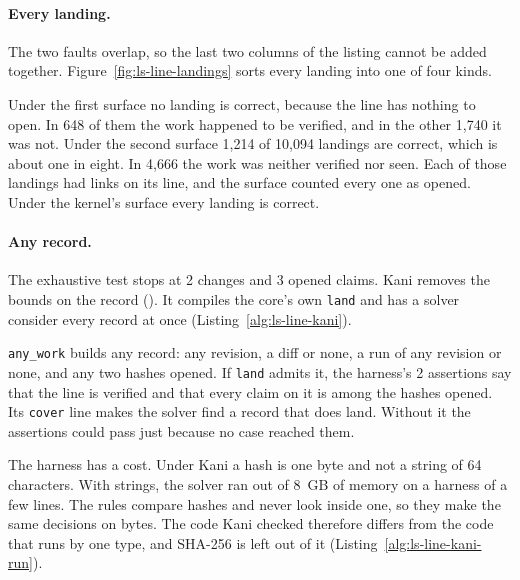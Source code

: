 \paragraph{Every landing.}
The two faults overlap, so the last two columns of the listing cannot be
added together. Figure~\ref{fig:ls-line-landings} sorts every landing into
one of four kinds.



Under the first surface no landing is correct, because the line has
nothing to open. In 648 of them the work happened to be verified, and in
the other 1,740 it was not. Under the second surface 1,214 of 10,094
landings are correct, which is about one in eight. In 4,666 the work was
neither verified nor seen. Each of those landings had links on its line,
and the surface counted every one as opened. Under the kernel's surface
every landing is correct.

\paragraph{Any record.}
The exhaustive test stops at 2 changes and 3 opened claims. Kani removes
the bounds on the record (). It compiles
the core's own \texttt{land} and has a solver consider every record at
once (Listing~\ref{alg:ls-line-kani}).

\texttt{any\_work} builds any record: any revision, a diff or none, a run
of any revision or none, and any two hashes opened. If \texttt{land} admits
it, the harness's 2 assertions say that the line is verified and that every
claim on it is among the hashes opened. Its \texttt{cover} line makes the
solver find a record that does land. Without it the assertions could pass
just because no case reached them.

The harness has a cost. Under Kani a hash is one byte and not a string of
64 characters. With strings, the solver ran out of 8~GB of memory on a
harness of a few lines. The rules compare hashes and never look inside
one, so they make the same decisions on bytes. The code Kani checked
therefore differs from the code that runs by one type, and SHA-256 is left
out of it (Listing~\ref{alg:ls-line-kani-run}).



